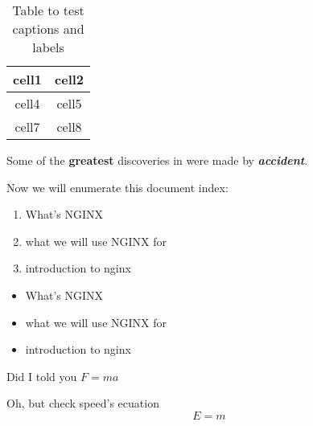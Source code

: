 \documentclass[10pt, a4paper]{article} %
\begin{document}
\begin{table}[h!]
    \begin{center} %
        \begin{tabular}{ |c|c| }
        \hline
        cell1 & cell2 \\ 
        \hline
        cell4 & cell5 \\
        \hline  
        cell7 & cell8 \\ 
        \hline 
        \end{tabular}
    \end{center}
    \caption{Table to test captions and labels}
    \label{table:data2}
\end{table}
        



Some of the \textbf{greatest} discoveries in were made by \textbf{\textit{accident}}.

Now we will enumerate this document index:


\begin{enumerate} %
    \item What's NGINX
    \item what we will use NGINX for
    \item introduction to nginx
\end{enumerate}

\begin{itemize} %
    \item What's NGINX
    \item what we will use NGINX for
    \item introduction to nginx
\end{itemize}

Did I told you $F=ma$

Oh, but check speed's ecuation
\begin{equation}
    E=m
\end{equation}
\end{document}

